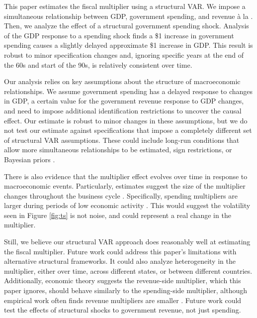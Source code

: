 This paper estimates the fiscal multiplier using a structural VAR. We impose a simultaneous relationship between GDP, government spending, and revenue à la \textcite{blanchard2002empirical}. Then, we analyze the effect of a structural government spending shock. Analysis of the GDP response to a spending shock finds a \$1 increase in government spending causes a slightly delayed approximate \$1 increase in GDP. This result is robust to minor specification changes and, ignoring specific years at the end of the 60s and start of the 90s, is relatively consistent over time.

Our analysis relies on key assumptions about the structure of macroeconomic relationships. We assume government spending has a delayed response to changes in GDP, a certain value for the government revenue response to GDP changes, and need to impose additional identification restrictions to uncover the causal effect. Our estimate is robust to minor changes in these assumptions, but we do not test our estimate against specifications that impose a completely different set of structural VAR assumptions. These could include long-run conditions that allow more simultaneous relationships to be estimated, sign restrictions, or Bayesian priors \parencites{mountford2009effects}{afonso2019fiscal}.

There is also evidence that the multiplier effect evolves over time in response to macroeconomic events. Particularly, estimates suggest the size of the multiplier changes throughout the business cycle \parencites{baum2012fiscal}{albonico2021public}. Specifically, spending multipliers are larger during periods of low economic activity \parencite{arin2015fiscal}. This would suggest the volatility seen in Figure \ref{fig:ts} is not noise, and could represent a real change in the multiplier.

Still, we believe our structural VAR approach does reasonably well at estimating the fiscal multiplier. Future work could address this paper's limitations with alternative structural frameworks. It could also analyze heterogeneity in the multiplier, either over time, across different states, or between different countries. Additionally, economic theory suggests the revenue-side multiplier, which this paper ignores, should behave similarly to the spending-side multiplier, although empirical work often finds revenue multipliers are smaller \parencite{mineshima2014size}. Future work could test the effects of structural shocks to government revenue, not just spending.
